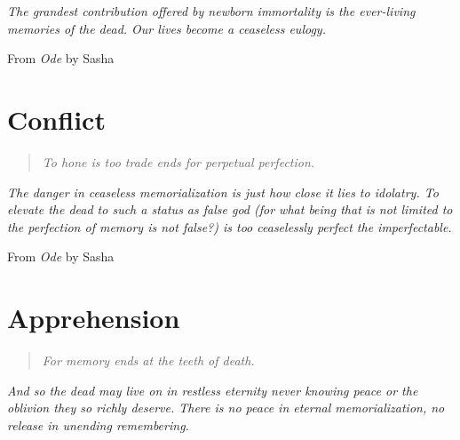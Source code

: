 \documentclass[10pt]{memoir}
\begin{document}
  \noindent\emph{The grandest contribution offered by newborn immortality is the ever-living memories of the dead. Our lives become a ceaseless eulogy.}

  \vspace{1em}

  From \emph{Ode} by Sasha
  \vfill

  
  
  
  
  
  
  
  

  \renewcommand*{\theHpart}{conflict}
  \part{Conflict}
  \begin{quote}\itshape
    To hone is too trade ends for perpetual perfection.
  \end{quote}
  
  \noindent\emph{The danger in ceaseless memorialization is just how close it lies to idolatry. To elevate the dead to such a status as false god (for what being that is not limited to the perfection of memory is not false?) is too ceaselessly perfect the imperfectable.}

  \vspace{1em}

  From \emph{Ode} by Sasha
  \vfill

  
  
  
  
  
  
  
  
  
  

  \renewcommand*{\theHpart}{apprehension}
  \part{Apprehension}
  \begin{quote}\itshape
    For memory ends at the teeth of death.
  \end{quote}
  
  \noindent\emph{And so the dead may live on in restless eternity never knowing peace or the oblivion they so richly deserve. There is no peace in eternal memorialization, no release in unending remembering.}

  \vspace{1em}
\end{document}
